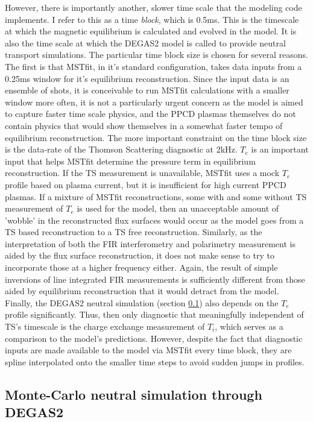 However, there is importantly another, slower time scale that the modeling code implements. I refer to this as a time \textit{block}, which is 0.5ms. This is the timescale at which the magnetic equilibrium is calculated and evolved in the model. It is also the time scale at which the DEGAS2 model is called to provide neutral transport simulations. The particular time block size is chosen for several reasons. The first is that MSTfit, in it's standard configuration, takes data inputs from a 0.25ms window for it's equilibrium reconstruction. Since the input data is an ensemble of shots, it is conceivable to run MSTfit calculations with a smaller window more often, it is not a particularly urgent concern as the model is aimed to capture faster time scale physics, and the PPCD plasmas themselves do not contain physics that would show themselves in a somewhat faster tempo of equilibrium reconstruction. The more important constraint on the time block size is the data-rate of the Thomson Scattering diagnostic at 2kHz. $T_e$ is an important input that helps MSTfit determine the pressure term in equilibrium reconstruction. If the TS measurement is unavailable, MSTfit uses a mock $T_e$ profile based on plasma current, but it is insufficient for high current PPCD plasmas. If a mixture of MSTfit reconstructions, some with and some without TS measurement of $T_e$ is used for the model, then an unacceptable amount of 'wobble' in the reconstructed flux surfaces would occur as the model goes from a TS based reconstruction to a TS free reconstruction. Similarly, as the interpretation of both the FIR interferometry and polarimetry measurement is aided by the flux surface reconstruction, it does not make sense to try to incorporate those at a higher frequency either. Again, the result of simple inversions of line integrated FIR measurements is sufficiently different from those aided by equilibrium reconstruction that it would detract from the model. Finally, the DEGAS2 neutral simulation (section \ref{sec:DEGAS2}) also depends on the $T_e$ profile significantly. Thus, then only diagnostic that meaningfully independent of TS's timescale is the charge exchange measurement of $T_i$, which serves as a comparison to the model's predictions. However, despite the fact that diagnostic inputs are made available to the model via MSTfit every time block, they are spline interpolated onto the smaller time steps to avoid sudden jumps in profiles.

\subsection{Monte-Carlo neutral simulation through DEGAS2}\label{sec:DEGAS2}

